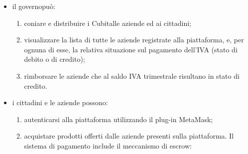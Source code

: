 \begin{itemize}
	\item il governo\glosp può:
	\begin{enumerate}[label=\alph*.]
		\item coniare e distribuire i Cubit\glosp alle aziende ed ai cittadini;
		\item visualizzare la lista di tutte le aziende registrate alla piattaforma, 
			e, per ognuna di esse, la relativa situazione sul pagamento dell'IVA (stato di 
			debito o di credito); 
		\item rimborsare le aziende che al saldo IVA trimestrale risultano in stato di 
			credito.
	\end{enumerate}
	\item i cittadini e le aziende possono:
	\begin{enumerate}[label=\alph*.]
		\item autenticarsi alla piattaforma utilizzando il plug-in MetaMask\glo;
		\item acquistare prodotti offerti dalle aziende presenti sulla piattaforma. Il 
			sistema di pagamento include il meccanismo di escrow\glo:
		

\end{enumerate}
\end{itemize}
